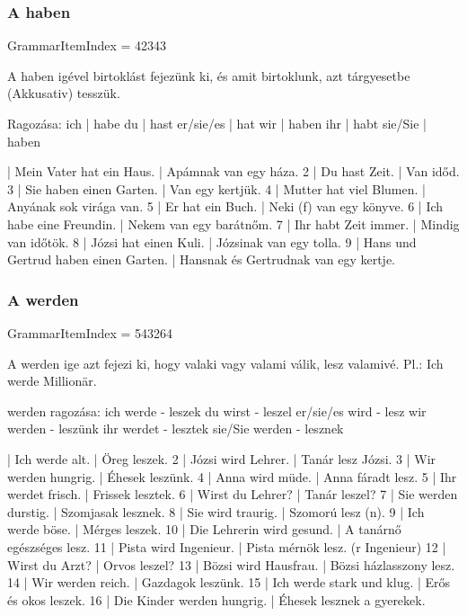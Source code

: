 \documentclass{article}
\newenvironment{desc}{\verbatim}{\endverbatim}
\newenvironment{exmp}{\verbatim}{\endverbatim}
\begin{document}
\begin{exmp}
\end{exmp}

\subsubsection{A haben}

GrammarItemIndex = 42343

\begin{desc}
A haben igével birtoklást fejezünk ki, és amit birtoklunk, azt tárgyesetbe (Akkusativ) tesszük.

Ragozása:
ich       | habe
du        | hast
er/sie/es | hat
wir       | haben
ihr       | habt
sie/Sie   | haben
\end{desc}

\begin{exmp}
1 | Mein Vater hat ein Haus. | Apámnak van egy háza.
2 | Du hast Zeit. | Van időd.
3 | Sie haben einen Garten. | Van egy kertjük.
4 | Mutter hat viel Blumen. | Anyának sok virága van.
5 | Er hat ein Buch. | Neki (f) van egy könyve.
6 | Ich habe eine Freundin. | Nekem van egy barátnőm.
7 | Ihr habt Zeit immer. | Mindig van időtök.
8 | Józsi hat einen Kuli. | Józsinak van egy tolla.
9 | Hans und Gertrud haben einen Garten. | Hansnak és Gertrudnak van egy kertje.
\end{exmp}

\subsubsection{A werden}

GrammarItemIndex = 543264

\begin{desc}
A werden ige azt fejezi ki, hogy valaki vagy valami válik, lesz
valamivé.
Pl.: Ich werde Millionär.

werden ragozása:
ich werde - leszek 
du wirst - leszel
er/sie/es wird - lesz
wir werden - leszünk
ihr werdet - lesztek
sie/Sie werden - lesznek
\end{desc}

\begin{exmp}
1 | Ich werde alt. | Öreg leszek.
2 | Józsi wird Lehrer. | Tanár lesz Józsi.
3 | Wir werden hungrig. | Éhesek leszünk.
4 | Anna wird müde. | Anna fáradt lesz.
5 | Ihr werdet frisch. | Frissek lesztek.
6 | Wirst du Lehrer? | Tanár leszel?
7 | Sie werden durstig. | Szomjasak lesznek.
8 | Sie wird traurig. | Szomorú lesz (n).
9 | Ich werde böse. | Mérges leszek.
10 | Die Lehrerin wird gesund. | A tanárnő egészséges lesz.
11 | Pista wird Ingenieur. | Pista mérnök lesz. (r Ingenieur)
12 | Wirst du Arzt? | Orvos leszel?
13 | Bözsi wird Hausfrau. | Bözsi házlasszony lesz.
14 | Wir werden reich. | Gazdagok leszünk.
15 | Ich werde stark und klug. | Erős és okos leszek.
16 | Die Kinder werden hungrig. | Éhesek lesznek a gyerekek.
\end{exmp}
\end{document}
